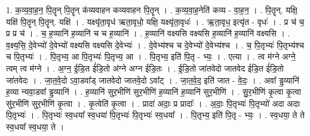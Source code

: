 \documentclass[17pt]{extarticle}
\begin{document}
1. क॒व्य॒वा॒ह॒न॒ पि॒तॄन् पि॒तॄन् क॑व्यवाहन कव्यवाहन पि॒तॄन् । . क॒व्य॒वा॒ह॒नेति॑ कव्य - वा॒ह॒न॒ । . पि॒तॄन्. यक्षि॒ यक्षि॑ पि॒तॄन् पि॒तॄन्. यक्षि॑ । . यक्ष्यृ॑ता॒वृध॑ ऋता॒वृधो॒ यक्षि॒ यक्ष्यृ॑ता॒वृधः॑ । . ऋ॒ता॒वृध॒ इत्यृ॑त - वृधः॑ । . प्र च॑ च॒ प्र प्र च॑ । . च॒ ह॒व्यानि॑ ह॒व्यानि॑ च च ह॒व्यानि॑ । . ह॒व्यानि॑ वक्ष्यसि वक्ष्यसि ह॒व्यानि॑ ह॒व्यानि॑ वक्ष्यसि । . व॒क्ष्य॒सि॒ दे॒वेभ्यो॑ दे॒वेभ्यो॑ वक्ष्यसि वक्ष्यसि दे॒वेभ्यः॑ । . दे॒वेभ्य॑श्च च दे॒वेभ्यो॑ दे॒वेभ्य॑श्च । . च॒ पि॒तृभ्यः॑ पि॒तृभ्य॑श्च च पि॒तृभ्यः॑ । . पि॒तृभ्य॒ आ पि॒तृभ्यः॑ पि॒तृभ्य॒ आ । . पि॒तृभ्य॒ इति॑ पि॒तृ - भ्यः॒ । . एत्या । . त्व म॑ग्ने अग्ने॒ त्वम् त्व म॑ग्ने । . अ॒ग्न॒ ई॒डि॒त ई॑डि॒तो अ॑ग्ने अग्न ईडि॒तः । . ई॒डि॒तो जा॑तवेदो जातवेद ईडि॒त ई॑डि॒तो जा॑तवेदः । . जा॒त॒वे॒दो ऽवा॒डवा᳚ड् जातवेदो जातवे॒दो ऽवा᳚ट् । . जा॒त॒वे॒द॒ इति॑ जात - वे॒दः॒ । . अवा᳚ ड्ढ॒व्यानि॑ ह॒व्या न्यवा॒डवा᳚ ड्ढ॒व्यानि॑ । . ह॒व्यानि॑ सुर॒भीणि॑ सुर॒भीणि॑ ह॒व्यानि॑ ह॒व्यानि॑ सुर॒भीणि॑ । . सु॒र॒भीणि॑ कृ॒त्वा कृ॒त्वा सु॑र॒भीणि॑ सुर॒भीणि॑ कृ॒त्वा । . कृ॒त्वेति॑ कृ॒त्वा । . प्रादा॑ अदाः॒ प्र प्रादाः᳚ । . अ॒दाः॒ पि॒तृभ्यः॑ पि॒तृभ्यो॑ अदा अदाः पि॒तृभ्यः॑ । . पि॒तृभ्यः॑ स्व॒धया᳚ स्व॒धया॑ पि॒तृभ्यः॑ पि॒तृभ्यः॑ स्व॒धया᳚ । . पि॒तृभ्य॒ इति॑ पि॒तृ - भ्यः॒ । . स्व॒धया॒ ते ते स्व॒धया᳚ स्व॒धया॒ ते । \newline
\end{document}
